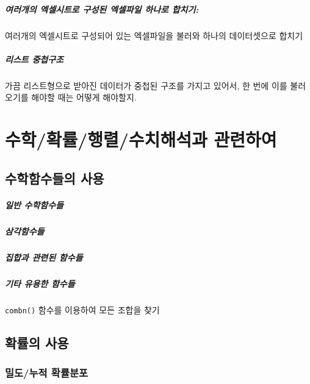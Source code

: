 \documentclass{report}
\begin{document}
\paragraph{여러개의 엑셀시트로 구성된 엑셀파일 하나로 합치기:} 여러개의 엑셀시트로 구성되어 있는 엑셀파일을 불러와 하나의 데이터셋으로 합치기

\paragraph{리스트 중첩구조} 
가끔 리스트형으로 받아진 데이터가 중첩된 구조를 가지고 있어서, 한 번에 이를 불러오기를 해야할 때는 어떻게 해야할지.



%
%
%

\chapter{수학/확률/행렬/수치해석과 관련하여}

\section{수학함수들의 사용}
\paragraph{일반 수학함수들}
\paragraph{삼각함수들}
\paragraph{집합과 관련된 함수들}
\paragraph{기타 유용한 함수들}
\texttt{combn()} 함수를 이용하여 모든 조합을 찾기

\section{확률의 사용}

\subsection{밀도/누적 확률분포}
\end{document}
